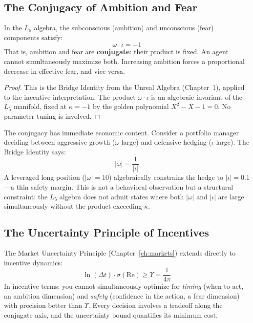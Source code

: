 \subsection{The Conjugacy of Ambition and Fear}

\begin{theorem}\label{thm:conjugacy}
In the $L_5$ algebra, the subconscious (ambition) and unconscious (fear) components satisfy:
\begin{equation}\label{eq:bridge_incentive}
    \omega \cdot \iota = -1
\end{equation}
That is, ambition and fear are \textbf{conjugate}: their product is fixed. An agent cannot simultaneously maximize both. Increasing ambition forces a proportional decrease in effective fear, and vice versa.
\end{theorem}

\begin{proof}
This is the Bridge Identity from the Unreal Algebra (Chapter~1), applied to the incentive interpretation. The product $\omega \cdot \iota$ is an algebraic invariant of the $L_5$ manifold, fixed at $\kappa = -1$ by the golden polynomial $X^2 - X - 1 = 0$. No parameter tuning is involved. \qedhere
\end{proof}

The conjugacy has immediate economic content. Consider a portfolio manager deciding between aggressive growth ($\omega$ large) and defensive hedging ($\iota$ large). The Bridge Identity says:
\begin{equation}
    |\omega| = \frac{1}{|\iota|}
\end{equation}
A leveraged long position ($|\omega| = 10$) algebraically constrains the hedge to $|\iota| = 0.1$---a thin safety margin. This is not a behavioral observation but a structural constraint: the $L_5$ algebra does not admit states where both $|\omega|$ and $|\iota|$ are large simultaneously without the product exceeding $\kappa$.

\subsection{The Uncertainty Principle of Incentives}

The Market Uncertainty Principle (Chapter~\ref{ch:markets}) extends directly to incentive dynamics:
\begin{equation}
    \ln(\Delta t) \cdot \sigma(\mathrm{Re}) \geq \Upsilon = \frac{1}{4\pi}
\end{equation}
In incentive terms: you cannot simultaneously optimize for \emph{timing} (when to act, an ambition dimension) and \emph{safety} (confidence in the action, a fear dimension) with precision better than $\Upsilon$. Every decision involves a tradeoff along the conjugate axis, and the uncertainty bound quantifies its minimum cost.

